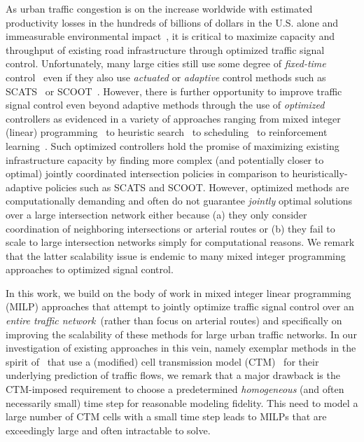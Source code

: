 As urban traffic congestion is on the increase worldwide with
estimated productivity losses in the hundreds of billions of dollars
in the U.S. alone and immeasurable environmental
impact~\cite{bazzan2013intro}, it is critical to maximize capacity and
throughput of existing road infrastructure through optimized traffic
signal control.  Unfortunately, many large cities still use some
degree of \emph{fixed-time} control~ even
if they also use \emph{actuated} or \emph{adaptive} control methods
such as SCATS~ or SCOOT~.
However, there is further opportunity to improve traffic signal
control even beyond adaptive methods through the use of
\emph{optimized} controllers as evidenced in a variety of approaches
ranging from mixed integer (linear)
programming~
to heuristic search~ to
scheduling~ to reinforcement
learning~.  Such optimized
controllers hold the promise of maximizing existing infrastructure
capacity by finding more complex (and potentially closer to optimal)
jointly coordinated intersection policies in comparison to
heuristically-adaptive policies such as SCATS and SCOOT. 
However, optimized methods are computationally demanding 
and often do not guarantee \emph{jointly} optimal solutions over a
large intersection network either because (a) they only consider
coordination of neighboring intersections or arterial routes or (b)
they fail to scale to large intersection networks simply for
computational reasons.  We remark that the latter scalability issue is endemic
to many mixed integer programming approaches to optimized signal control.

In this work, we build on the body of work in mixed integer linear
programming (MILP) approaches that attempt to jointly optimize traffic
signal control over an \emph{entire traffic network}~(rather than
focus on arterial routes) and specifically on improving the
scalability of these methods for large urban traffic networks.  In our
investigation of existing approaches in this vein, namely exemplar
methods in the spirit of~ that
use a (modified) cell transmission model
(CTM)~ for their underlying
prediction of traffic flows, we remark that a major drawback is the
CTM-imposed requirement to choose a predetermined \emph{homogeneous} (and
often necessarily small) time step for reasonable modeling fidelity.
This need to model a large number of CTM cells with a small time step
leads to MILPs that are exceedingly large and often intractable to
solve. %

